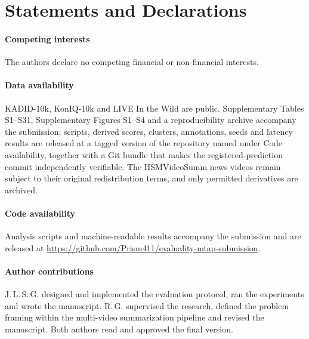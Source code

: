 \documentclass[sn-basic,Numbered]{sn-jnl}
\begin{document}
\maketitle








\section*{Statements and Declarations}

\paragraph{Competing interests}
The authors declare no competing financial or non-financial interests.

\paragraph{Data availability}
KADID-10k, KonIQ-10k and LIVE In the Wild are public. Supplementary Tables S1--S31, Supplementary Figures S1--S4 and a reproducibility archive accompany the
submission; scripts, derived scores, clusters, annotations, seeds and latency
results are released at a tagged version of the repository named under Code
availability, together with a Git bundle that makes the registered-prediction
commit independently verifiable. The HSMVideoSumm news videos remain subject to
their original redistribution terms, and only permitted derivatives are archived.

\paragraph{Code availability}
Analysis scripts and machine-readable results accompany the submission and are
released at \url{https://github.com/Prism411/evaluality-mtap-submission}.

\paragraph{Author contributions}
J.\,L.\,S.\,G. designed and implemented the evaluation protocol, ran the
experiments and wrote the manuscript. R.\,G. supervised the research, defined
the problem framing within the multi-video summarization pipeline and revised
the manuscript. Both authors read and approved the final version.
\end{document}
